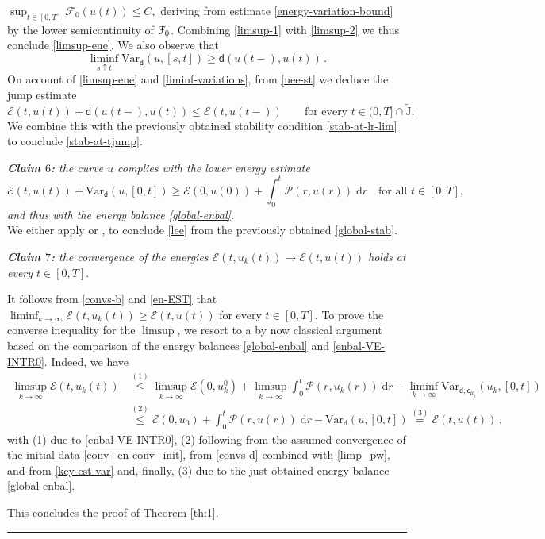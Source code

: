 \documentclass[a4paper,10pt,reqno]{amsart} %
\numberwithin{equation}{section}
\newcommand{\up}{\uparrow}
\newcommand{\QED}{\mbox{}\hfill\rule{5pt}{5pt}\medskip\par}
\def\dd{\;\!\mathrm{d}} %
\newcommand{\mdn}{\mathsf{d}}
\newcommand{\md}[2]{\mathsf{d}(#1,#2)}
\newcommand{\ene}[2]{\mathcal{E}(#1,#2)}
\newcommand{\perto}[1]{\mathcal{F}_0(#1)}
\newcommand{\pw}[2]{\mathcal{P}(#1,#2)}
\newcommand{\Vari}[4]{\mathrm{Var}_{#1}(#2,[#3,#4])}
\newcommand{\lli}[2]{{#1}({#2}{-})}
\newcommand{\tjump}{\widetilde{\mathrm{J}}}
\newcommand{\vecostnamep}[1]{\mathsf{c}_{#1}}
\begin{document}
    $
    \sup_{t\in [0,T]}\perto {u(t)} \leq C,
    $
    deriving from 
  estimate \eqref{energy-variation-bound} by the lower semicontinuity of ${\mathcal F}_0$. 
       Combining \eqref{limsup-1} with \eqref{limsup-2} we thus conclude  \eqref{limsup-ene}. 
    We also observe that
    \begin{equation}
    \label{liminf-variations}
    \liminf_{s\up t} \Vari{\mdn}{u}{s}t \geq \md{\lli u t }{u(t)}\,.
    \end{equation}
    On account of \eqref{limsup-ene} and \eqref{liminf-variations},
    from \eqref{uee-st} we deduce the jump estimate
    \begin{equation}
    \label{localized-at-jump}
    \ene t{u(t)} + \md{\lli u t }{u(t)} \leq \ene t{\lli u t}  \qquad \text{for every } t \in (0,T] \cap \tjump.
    \end{equation}
    We combine this with the previously obtained stability condition \eqref{stab-at-lr-lim} to conclude \eqref{stab-at-tjump}. 
 \par
\emph{\textbf{Claim $6$:} the curve $u$ complies with the lower energy estimate}
 \begin{equation}
 \label{lee}
 \ene t{u(t)} + \Vari {\mdn}{u}0{t} \geq \ene 0{u(0)} +\int_0^t \pw r{u(r)} \dd r \quad \text{for all } t \in [0,T],
 \end{equation}
\emph{and thus with the energy balance \eqref{global-enbal}.}
\\
We either  apply \cite[Prop.\ 2.1.23]{MieRouBOOK} or \cite[Lemma 6.2, Thm.\ 6.5]{SavMin16}, to conclude \eqref{lee} from the previously obtained \eqref{global-stab}.
 \par
\emph{\textbf{Claim $7$:}  the convergence of the energies $\ene t{u_k(t)} \to \ene t{u(t)}$ holds at every $t\in [0,T]$}.
\par
It follows from \eqref{convs-b} and \eqref{en-EST} that $\liminf_{k\to\infty} \ene t{u_k(t)}  
\geq \ene t{u(t)}$ for every $t\in [0,T]$. To prove the converse inequality for the $\limsup$, we resort to a by now classical argument based on the comparison of the energy balances \eqref{global-enbal} and \eqref{enbal-VE-INTR0}. Indeed, we have 
\[
\begin{aligned}
\limsup_{k\to\infty} \ene t{u_k(t)}   & \stackrel{(1)}{\leq}
\limsup_{k\to\infty} \ene 0{u_k^0} + \limsup_{k\to\infty} \int_0^t \pw r{u_k(r)} \dd  r 
-\liminf_{k\to\infty} \Vari{\mdn,\vecostnamep{\mu_{k}}}{u_{k}}{0}{t}
\\
& 
\stackrel{(2)}{\leq} \ene 0{u_0} + \int_0^t \pw r{u(r)} \dd r 
-  \Vari {\mdn}{u}0{t}\stackrel{(3)}{=} \ene t{u(t)}\,,
\end{aligned}
\]
with {\footnotesize (1)} due to \eqref{enbal-VE-INTR0}, {\footnotesize (2)} following from the assumed convergence of the initial data \eqref{conv+en-conv_init}, from \eqref{convs-d} combined with \eqref{limp_pw}, and from \eqref{key-est-var} and, finally, 
{\footnotesize (3)} due to  the just obtained energy balance  \eqref{global-enbal}.
\par
This concludes the proof of Theorem \ref{th:1}.  
\QED
\end{document}
